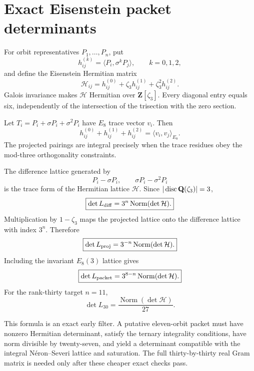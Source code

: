 \section{Exact Eisenstein packet determinants}

For orbit representatives $P_1,\ldots,P_n$, put
\[
h_{ij}^{(k)}=\langle P_i,\sigma^kP_j\rangle,
\qquad k=0,1,2,
\]
and define the Eisenstein Hermitian matrix
\[
\boxed{
\mathcal H_{ij}
=h_{ij}^{(0)}+\zeta_3h_{ij}^{(1)}+\zeta_3^2h_{ij}^{(2)}.
}
\]
Galois invariance makes $\mathcal H$ Hermitian over
$\mathbf Z[\zeta_3]$.  Every diagonal entry equals six, independently of the
intersection of the trisection with the zero section.

Let $T_i=P_i+\sigma P_i+\sigma^2P_i$ have $E_8$ trace vector $v_i$.  Then
\[
h_{ij}^{(0)}+h_{ij}^{(1)}+h_{ij}^{(2)}
=\langle v_i,v_j\rangle_{E_8}.
\]
The projected pairings are integral precisely when the trace residues obey
the mod-three orthogonality constraints.

The difference lattice generated by
\[
P_i-\sigma P_i,
\qquad
\sigma P_i-\sigma^2P_i
\]
is the trace form of the Hermitian lattice $\mathcal H$.  Since
$|\operatorname{disc}\mathbf Q(\zeta_3)|=3$,
\[
\boxed{
\det L_{\rm diff}=3^n\operatorname{Norm}(\det\mathcal H).
}
\]
Multiplication by $1-\zeta_3$ maps the projected lattice onto the difference
lattice with index $3^n$.  Therefore
\[
\boxed{
\det L_{\rm proj}=3^{-n}\operatorname{Norm}(\det\mathcal H).
}
\]
Including the invariant $E_8(3)$ lattice gives
\[
\boxed{
\det L_{\rm packet}=3^{8-n}\operatorname{Norm}(\det\mathcal H).
}
\]
For the rank-thirty target $n=11$,
\[
\boxed{
\det L_{30}=\frac{\operatorname{Norm}(\det\mathcal H)}{27}.
}
\]

This formula is an exact early filter.  A putative eleven-orbit packet must
have nonzero Hermitian determinant, satisfy the ternary integrality
conditions, have norm divisible by twenty-seven, and yield a determinant
compatible with the integral N\'eron--Severi lattice and saturation.  The full
thirty-by-thirty real Gram matrix is needed only after these cheaper exact
checks pass.
